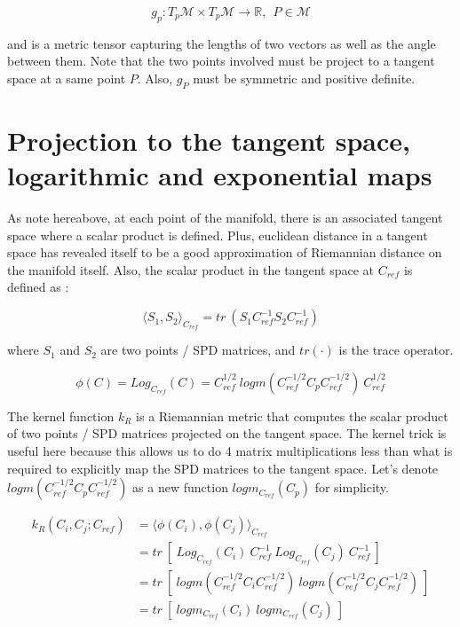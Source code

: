 \documentclass[a4paper,11pt]{report}
\begin{document}
\begin{equation}
    g_p: T_p \mathcal{M} \times T_p \mathcal{M} \rightarrow \mathbb{R}, \ \ P \in \mathcal{M}
\end{equation}

and is a metric tensor capturing the lengths of two vectors as well as the angle between them. Note that the two
points involved must be project to a tangent space at a same point $P$. Also, $g_P$ must be symmetric and positive definite.

\section{Projection to the tangent space, logarithmic and exponential maps}

As note hereabove, at each point of the manifold, there is an associated tangent space where a scalar product is defined.
Plus, euclidean distance in a tangent space has revealed itself to be a good approximation of Riemannian distance
on the manifold itself. Also, the scalar product in the tangent space at $C_{ref}$ is defined as \citep{BARACHANT2013172}:

\begin{equation}
    \langle S_1, S_2 \rangle_{C_{ref}} = tr \ (S_1 C_{ref}^{-1} S_2 C_{ref}^{-1})
\end{equation}

where $S_1$ and $S_2$ are two points / SPD matrices, and $tr(\cdot)$ is the trace operator.

\begin{equation}
    \phi(C) = Log_{C_{ref}} (C) = C_{ref}^{1/2} \ logm(C_{ref}^{-1/2} C_p C_{ref}^{-1/2}) \ C_{ref}^{1/2}
\end{equation}

The kernel function $k_R$ is a Riemannian metric that computes the scalar product of two points / SPD matrices projected
on the tangent space. The kernel trick is useful here because this allows us to do 4 matrix multiplications less than
what is required to explicitly map the SPD matrices to the tangent space.
Let's denote $logm(C_{ref}^{-1/2} C_p C_{ref}^{-1/2})$ as a new function $logm_{C_{ref}} (C_p)$ for simplicity.

\begin{align}
    k_R(C_i, C_j; C_{ref}) & = \langle \phi(C_i), \phi(C_j) \rangle_{C_{ref}} \\
    & = tr \ [\ Log_{C_{ref}} (C_i) \ C_{ref}^{-1} \ Log_{C_{ref}} (C_j) \ C_{ref}^{-1} \ ] \\
    & = tr \ [\ logm(C_{ref}^{-1/2} C_i C_{ref}^{-1/2}) \ logm(C_{ref}^{-1/2} C_j C_{ref}^{-1/2}) \ ] \\
    & = tr \ [\ logm_{C_{ref}} (C_i) \ logm_{C_{ref}} (C_j) \ ] 
\end{align}
\end{document}
